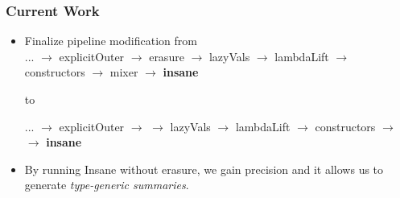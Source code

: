 \documentclass[hyperref={pdfpagelabels=false}]{beamer}
\begin{document}
\begin{frame}[fragile]
\frametitle{Current Work}
    \begin{itemize}
        \item Finalize pipeline modification from \\
            \vspace{5pt}
            ...  $\rightarrow$ explicitOuter $\rightarrow$  erasure $\rightarrow$ lazyVals $\rightarrow$ lambdaLift $\rightarrow$ constructors $\rightarrow$ mixer $\rightarrow$ \textbf{insane}

            \vspace{5pt}
            to \\
            \vspace{5pt}

            ...  $\rightarrow$ explicitOuter $\rightarrow$  $\rightarrow$ lazyVals $\rightarrow$ lambdaLift $\rightarrow$ constructors $\rightarrow$  $\rightarrow$ \textbf{insane}

        \item By running Insane without erasure, we gain precision and it
        allows us to generate \emph{type-generic summaries}.

    \end{itemize}
\end{frame}
\end{document}
